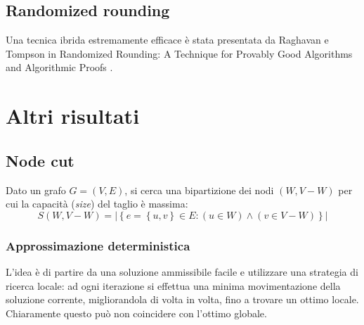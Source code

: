 \subsection{Randomized rounding}

Una tecnica ibrida estremamente efficace è stata presentata da Raghavan e Tompson in
Randomized Rounding: A Technique for Provably Good Algorithms and Algorithmic Proofs
\cite{Raghavan:1987:RRT:45291.45296}.


\section{Altri risultati}

\subsection{Node cut}

Dato un grafo $
G = (V,E)
$, si cerca una bipartizione dei nodi $
( W, V-W )
$ per cui la capacità (\emph{size}) del taglio è massima:
\begin{equation*}
    S \left( W, V-W \right) = 
    | \left\{ 
        e = \left\{ u,v \right\} \in E : 
        \left( u \in W \right)
        \wedge
        \left( v \in V-W \right)
    \right\} |
\end{equation*}

\subsubsection{Approssimazione deterministica}

L'idea è di partire da una soluzione ammissibile facile e utilizzare una strategia di ricerca locale: ad ogni iterazione si effettua una minima movimentazione della soluzione corrente, migliorandola di volta in volta, fino a trovare un ottimo locale. Chiaramente questo può non coincidere con l'ottimo globale.


